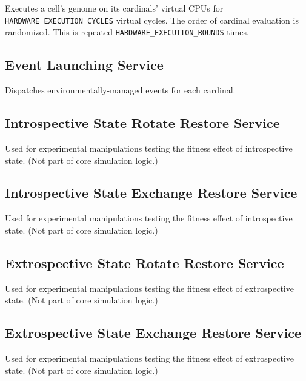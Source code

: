 Executes a cell's genome on its cardinals' virtual CPUs for \texttt{HARDWARE\_EXECUTION\_CYCLES} virtual cycles.
The order of cardinal evaluation is randomized.
This is repeated \texttt{HARDWARE\_EXECUTION\_ROUNDS} times.

\subsection{Event Launching Service}


Dispatches environmentally-managed events for each cardinal.

\subsection{Introspective State Rotate Restore Service}


Used for experimental manipulations testing the fitness effect of introspective state.
(Not part of core simulation logic.)

\subsection{Introspective State Exchange Restore Service}


Used for experimental manipulations testing the fitness effect of introspective state.
(Not part of core simulation logic.)

\subsection{Extrospective State Rotate Restore Service}


Used for experimental manipulations testing the fitness effect of extrospective state.
(Not part of core simulation logic.)

\subsection{Extrospective State Exchange Restore Service}


Used for experimental manipulations testing the fitness effect of extrospective state.
(Not part of core simulation logic.)

